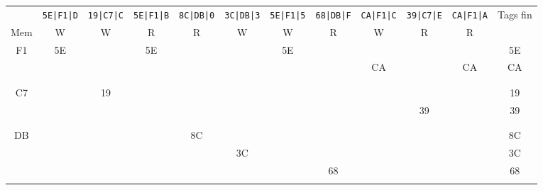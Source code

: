 \documentclass{article}
\begin{document}
\begin{tabular}{c|*{10}{c}|c|}
	    & \verb$5E|F1|D$ & \verb$19|C7|C$ & \verb$5E|F1|B$ & \verb$8C|DB|0$ & \verb$3C|DB|3$ & \verb$5E|F1|5$ & \verb$68|DB|F$ & \verb$CA|F1|C$ & \verb$39|C7|E$ & \verb$CA|F1|A$ & Tags fin \\
	Mem & W              & W              & R              & R              & W              & W              & R              & W              & R              & R              &          \\ \hline
	F1  & 5E             &                & 5E             &                &                & 5E             &                &                &                &                & 5E       \\
	    &                &                &                &                &                &                &                & CA             &                & CA             & CA       \\
	    &                &                &                &                &                &                &                &                &                &                &          \\
	    &                &                &                &                &                &                &                &                &                &                &          \\ \hline
	C7  &                & 19             &                &                &                &                &                &                &                &                & 19       \\
	    &                &                &                &                &                &                &                &                & 39             &                & 39       \\
	    &                &                &                &                &                &                &                &                &                &                &          \\
	    &                &                &                &                &                &                &                &                &                &                &          \\ \hline
	DB  &                &                &                & 8C             &                &                &                &                &                &                & 8C       \\
	    &                &                &                &                & 3C             &                &                &                &                &                & 3C       \\
	    &                &                &                &                &                &                & 68             &                &                &                & 68       \\
	    &                &                &                &                &                &                &                &                &                &                &          \\ \hline
\end{tabular}
\end{document}
